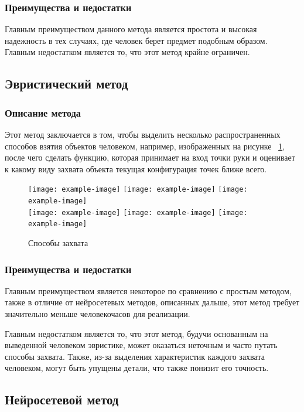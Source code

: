 \documentclass[12pt, a4paper]{article}
\begin{document}
\subsubsection{Преимущества и недостатки}
Главным преимуществом данного метода является простота и высокая надежность в тех случаях, где человек берет предмет подобным образом.
Главным недостатком является то, что этот метод крайне ограничен.

\subsection{Эвристический метод}
\subsubsection{Описание метода}
Этот метод заключается в том, чтобы выделить несколько распространенных способов
взятия объектов человеком, например, изображенных на рисунке
~\ref{fig:heuristic_gripping_variants}, после чего сделать функцию, которая
принимает на вход точки руки и оценивает к какому виду захвата объекта текущая
конфигурация точек ближе всего.

\begin{figure}
    \texttt{[image: example-image]}\hfill
    \texttt{[image: example-image]}\hfill
    \texttt{[image: example-image]}
    \\[\smallskipamount]
    \texttt{[image: example-image]}\hfill
    \texttt{[image: example-image]}\hfill
    \texttt{[image: example-image]}
    \caption{Способы захвата}
\label{fig:heuristic_gripping_variants}
\end{figure}

\subsubsection{Преимущества и недостатки}
Главным преимуществом является некоторое по сравнению с простым методом, также в
отличие от нейросетевых методов, описанных дальше, этот метод требует
значительно меньше человекочасов для реализации.
\par
Главным недостатком является то, что этот метод, будучи основанным на выведенной
человеком эвристике, может оказаться неточным и часто путать способы захвата.
Также, из-за выделения характеристик каждого захвата человеком, могут быть упущены детали, что также понизит его точность.

\subsection{Нейросетевой метод}
\end{document}
